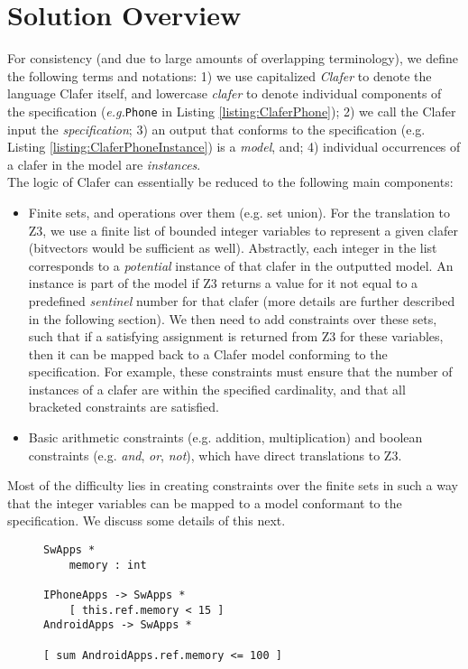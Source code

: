 \documentclass{article}
\newcommand{\eg}{\emph{e.g.}\xspace}
\begin{document}
\section{Solution Overview}
For consistency (and due to large amounts of overlapping terminology), we define the following terms and notations: 1) we use capitalized \textit{Clafer} to denote the language Clafer itself, and lowercase \textit{clafer} to denote individual components of the specification (\eg \texttt{Phone} in Listing \ref{listing:ClaferPhone}); 2) we call the Clafer input the \textit{specification}; 3) an output that conforms to the specification (e.g. Listing \ref{listing:ClaferPhoneInstance}) is a \textit{model}, and; 4) individual occurrences of a clafer in the model are \textit{instances}. \\
\indent The logic of Clafer can essentially be reduced to the following main components:
\begin{itemize}
\item Finite sets, and operations over them (e.g. set union). For the translation to Z3, we use a finite list of bounded integer variables to represent a given clafer (bitvectors would be sufficient as well). Abstractly, each integer in the list corresponds to a \textit{potential} instance of that clafer in the outputted model. An instance is part of the model if Z3 returns a value for it not equal to a predefined \textit{sentinel} number for that clafer (more details are further described in the following section). We then need to add constraints over these sets, such that if a satisfying assignment is returned from Z3 for these variables, then it can be mapped back to a Clafer model conforming to the specification. For example, these constraints must ensure that the number of instances of a clafer are within the specified cardinality, and that all bracketed constraints are satisfied.
\item Basic arithmetic constraints (e.g. addition, multiplication) and boolean constraints (e.g. \textit{and}, \textit{or}, \textit{not}), which have direct translations to Z3.
\end{itemize} 

Most of the difficulty lies in creating constraints over the finite sets in such a way that the integer variables can be mapped to a model conformant to the specification. We discuss some details of this next.


\begin{figure}[!t]
\centering
\begin{lstlisting}[language=clafer, caption=A more complex mobile phone specification in clafer., label={listing:ClaferMoreComplexSpec}]
SwApps *
	memory : int

IPhoneApps -> SwApps *	
	[ this.ref.memory < 15 ]
AndroidApps -> SwApps *

[ sum AndroidApps.ref.memory <= 100 ]	
\end{lstlisting}%
\end{figure}
\end{document}
